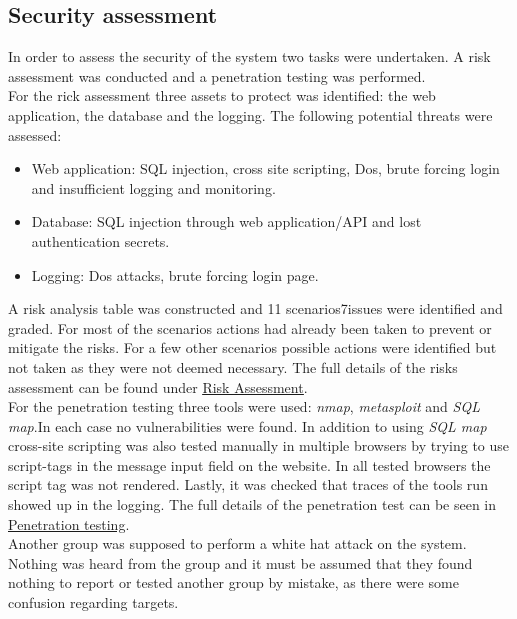 \subsection{Security assessment} %
In order to assess the security of the system two tasks were undertaken. A risk assessment was conducted and a penetration testing was performed.\\
For the rick assessment three assets to protect was identified: the web application, the database and the logging. The following potential threats were assessed:
\begin{itemize}
    \item Web application: SQL injection, cross site scripting, Dos, brute forcing login and insufficient logging and monitoring.
    \item Database: SQL injection through web application/API and lost authentication secrets.
    \item Logging: Dos attacks, brute forcing login page.
\end{itemize}

A risk analysis table was constructed and 11 scenarios7issues were identified and graded. For most of the scenarios actions had already been taken to prevent or mitigate the risks. For a few other scenarios possible actions were identified but not taken as they were not deemed necessary. The full details of the risks assessment can be found under \underline{\href{https://github.com/DevOps2021-gb/devops2021/wiki/Risk-assesment}{Risk Assessment}}.\\

For the penetration testing three tools were used: \textit{nmap}, \textit{metasploit} and \textit{SQL map}.In each case no vulnerabilities were found. In addition to using \textit{SQL map} cross-site scripting was also tested manually in multiple browsers by trying to use script-tags in the message input field on the website. In all tested browsers the script tag was not rendered. Lastly, it was checked that traces of the tools run showed up in the logging. The full details of the penetration test can be seen in \underline{\href{https://github.com/DevOps2021-gb/devops2021/wiki/Penetration-testing}{Penetration testing}}. \\

Another group was supposed to perform a white hat attack on the system. Nothing was heard from the group and it must be assumed that they found nothing to report or tested another group by mistake, as there were some confusion regarding targets.

